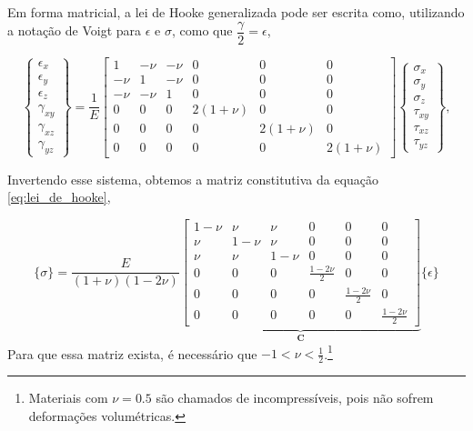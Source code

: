 Em forma matricial, a lei de Hooke generalizada pode ser escrita como, utilizando a notação de Voigt para ${\epsilon}$ e ${\sigma}$, como que $\dfrac{\gamma}{2} = \epsilon$,

\begin{equation}
    \begin{Bmatrix}
        \epsilon_x \\
        \epsilon_y \\
        \epsilon_z \\
        \gamma_{xy} \\
        \gamma_{xz} \\
        \gamma_{yz}
    \end{Bmatrix}
    =
    \frac{1}{E}
    \begin{bmatrix}
        1 & -\nu & -\nu & 0 & 0 & 0 \\
        -\nu & 1 & -\nu & 0 & 0 & 0 \\
        -\nu & -\nu & 1 & 0 & 0 & 0 \\
        0 & 0 & 0 & 2(1+\nu) & 0 & 0 \\
        0 & 0 & 0 & 0 & 2(1+\nu) & 0 \\
        0 & 0 & 0 & 0 & 0 & 2(1+\nu)
    \end{bmatrix}
    \begin{Bmatrix}
        \sigma_x \\
        \sigma_y \\
        \sigma_z \\
        \tau_{xy} \\
        \tau_{xz} \\
        \tau_{yz}
    \end{Bmatrix},
    \label{eq:lei_de_hooke_generalizada_matricial}
\end{equation}

Invertendo esse sistema, obtemos a matriz constitutiva da equação \ref{eq:lei_de_hooke},

\begin{equation}
    \{\sigma\} = \frac{E}{(1+\nu)(1-2\nu)}
    \underbrace{\begin{bmatrix} 1-\nu & \nu & \nu & 0 & 0 & 0 \\
        \nu & 1-\nu & \nu & 0 & 0 & 0 \\
        \nu & \nu & 1-\nu & 0 & 0 & 0 \\
        0 & 0 & 0 & \frac{1-2\nu}{2} & 0 & 0 \\
        0 & 0 & 0 & 0 & \frac{1-2\nu}{2} & 0 \\
        0 & 0 & 0 & 0 & 0 & \frac{1-2\nu}{2} 
    \end{bmatrix}}_{\bm{C}}
    \{\epsilon\}
\end{equation}
Para que essa matriz exista, é necessário que $-1 < \nu < \frac{1}{2}$.\footnote{Materiais com $\nu = 0.5$ são chamados de incompressíveis, pois não sofrem deformações volumétricas.}

